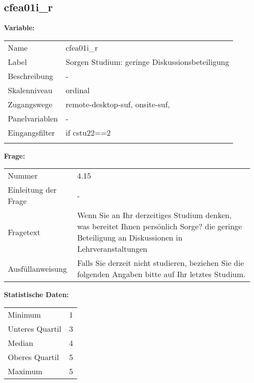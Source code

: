	
	
	\subsection{cfea01i\_r}
	\label{subSection:cfea01i_r}

	\noindent\textbf{Variable:}\\
		\begin{tabular}{lL{11.3cm}}
			\label{tableVariable:cfea01i_r}
			Name & cfea01i\_r \\
			Label & Sorgen Studium: geringe Diskussionsbeteiligung \\
			Beschreibung & - \\
			Skalenniveau & ordinal \\
			Zugangswege &
				remote-desktop-suf,
				onsite-suf,
 \\
			Panelvariablen & -
			 \\
			Eingangsfilter & if cstu22==2 \\
 \\
		\end{tabular}

		\vspace*{1 cm}
		\noindent\textbf{Frage:}\\
		\begin{tabular}{lL{11.3cm}}
			\label{tableQuestion:cfea01i_r}
			Nummer & 4.15 \\
			Einleitung der Frage & - \\
			Fragetext & Wenn Sie an Ihr derzeitiges Studium denken, was bereitet Ihnen persönlich Sorge?
die geringe Beteiligung an Diskussionen in Lehrveranstaltungen \\
			Ausfüllanweisung & Falls Sie derzeit nicht studieren, beziehen Sie die folgenden Angaben bitte auf Ihr letztes Studium. \\
		\end{tabular}


		\vspace*{1 cm}
		\noindent\textbf{Statistische Daten:}\\
			\begin{tabular}{ll}
				\label{tableStatistics:cfea01i_r}
					Minimum & 1 \\
					Unteres Quartil & 3 \\
					Median & 4 \\
					Oberes Quartil & 5 \\
					Maximum & 5 \\
			\end{tabular}



